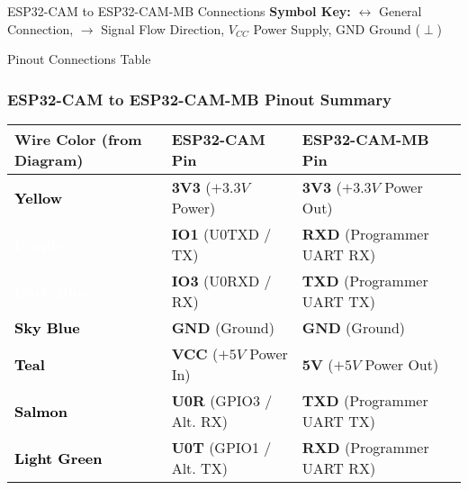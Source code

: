 \documentclass{beamer}
\begin{document}
\begin{frame}{ESP32-CAM to ESP32-CAM-MB Connections}
  \textbf{Symbol Key:}
  $\longleftrightarrow$ General Connection,
  $\longrightarrow$ Signal Flow Direction,
  $V_{CC}$ Power Supply,
  GND Ground ($\perp$)
\end{frame}

\begin{frame}{Pinout Connections Table}
  \frametitle{ESP32-CAM to ESP32-CAM-MB Pinout Summary}
  \renewcommand{\arraystretch}{1.3} %
  \begin{tabularx}{\textwidth}{|>{\centering\arraybackslash}p{2.2cm}|X|X|}
    \hline
    \textbf{Wire Color \newline (from Diagram)} & \textbf{ESP32-CAM Pin} & \textbf{ESP32-CAM-MB Pin} \\
    \hline
    \rowcolor{wireYellow!70} \textcolor{black}{\bf Yellow} & \textbf{3V3} \newline ($+3.3V$ Power) & \textbf{3V3} \newline ($+3.3V$ Power Out) \\
    \hline
    \rowcolor{wirePurple!70} \textcolor{white}{\bf Purple} & \textbf{IO1} \newline (U0TXD / TX) & \textbf{RXD} \newline (Programmer UART RX) \\
    \hline
    \rowcolor{wireDarkBlue!70} \textcolor{white}{\bf Dark Blue} & \textbf{IO3} \newline (U0RXD / RX) & \textbf{TXD} \newline (Programmer UART TX) \\
    \hline
    \rowcolor{wireSkyBlue!70} \textcolor{black}{\bf Sky Blue} & \textbf{GND} \newline (Ground) & \textbf{GND} \newline (Ground) \\
    \hline
    \rowcolor{wireTeal!70} \textcolor{black}{\bf Teal} & \textbf{VCC} \newline ($+5V$ Power In) & \textbf{5V} \newline ($+5V$ Power Out) \\
    \hline
    \rowcolor{wireSalmon!70} \textcolor{black}{\bf Salmon} & \textbf{U0R} \newline (GPIO3 / Alt. RX) & \textbf{TXD} \newline (Programmer UART TX) \\
    \hline
    \rowcolor{wireLightGreen!70} \textcolor{black}{\bf Light Green} & \textbf{U0T} \newline (GPIO1 / Alt. TX) & \textbf{RXD} \newline (Programmer UART RX) \\

\end{tabularx}
\end{frame}
\end{document}
